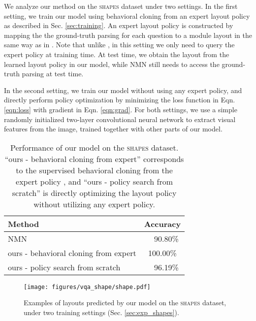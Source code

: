 \documentclass[10pt,twocolumn,letterpaper]{article}
\newcommand{\shapes}{\textsc{shapes}\xspace}
\begin{document}
We analyze our method on the \shapes dataset under two settings.
In the first setting, we train our model using behavioral cloning from an expert layout policy as described in Sec. \ref{sec:training}. An expert layout policy  is constructed by mapping the the ground-truth parsing for each question to a module layout in the same way as in \cite{andreas16neural}. Note that unlike \cite{andreas16neural}, in this setting we only need to query the expert policy at training time. At test time, we obtain the layout  from the learned layout policy  in our model, while NMN \cite{andreas16neural} still needs to access the ground-truth parsing at test time.

In the second setting, we train our model without using any expert policy, and directly perform policy optimization by minimizing the loss function  in Eqn. \ref{eqn:loss} with gradient  in Eqn. \ref{eqn:grad}. For both settings, we use a simple randomly initialized two-layer convolutional neural network to extract visual features from the image, trained together with other parts of our model.

\begin{table}[t]
\centering
\begin{tabular}{lc}
\toprule
Method & Accuracy \\
\hline
NMN \cite{andreas16neural} & ~~90.80\% \\
ours - behavioral cloning from expert & 100.00\% \\
ours - policy search from scratch & ~~96.19\% \\
\bottomrule
\end{tabular}\vspace{-0.2cm}
\caption{Performance of our model on the \shapes dataset. ``ours - behavioral cloning from expert'' corresponds to the supervised behavioral cloning from the expert policy , and ``ours - policy search from scratch'' is directly optimizing the layout policy without utilizing any expert policy.}
\label{tab:results_shapes}
\vspace{-0.2cm}
\end{table}

\begin{figure}[t]
\centering
\texttt{[image: figures/vqa\_shape/shape.pdf]}\vspace{-0.2cm}
\caption{Examples of layouts predicted by our model on the \shapes dataset, under two training settings (Sec. \ref{sec:exp_shapes}).}
\label{fig:visualization_shapes}
\vspace{-0.5cm}
\end{figure}
\end{document}
